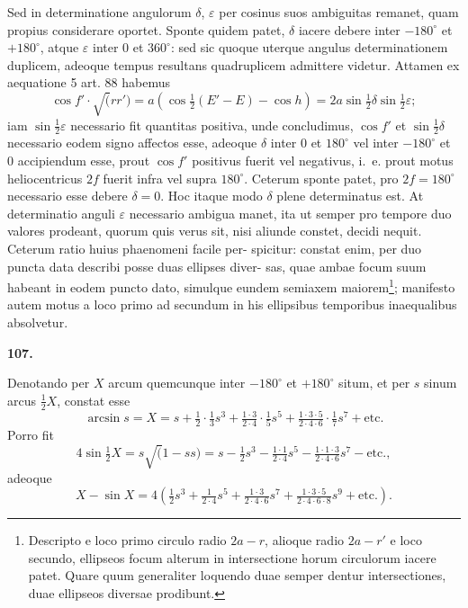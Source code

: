 \documentclass[12pt,a4paper]{article}
\begin{document}
Sed in determinatione angulorum $\delta$, $\varepsilon$ per cosinus suos ambiguitas remanet,
quam propius considerare oportet. Sponte quidem patet, $\delta$ iacere debere inter
$-180^\circ$ et $+180^\circ$, atque $\varepsilon$ inter $0$ et $360^\circ$: sed sic quoque uterque angulus
determinationem duplicem, adeoque tempus resultans quadruplicem admittere
videtur. Attamen ex aequatione 5 art. 88 habemus
\[
\cos f' \cdot \surd(rr') = a(\cos\tfrac{1}{2}(E'-E) - \cos h) = 2a\sin\tfrac{1}{2}\delta\sin\tfrac{1}{2}\varepsilon;
\]
iam $\sin\tfrac{1}{2}\varepsilon$ necessario fit quantitas positiva, unde concludimus, $\cos f'$ et $\sin\tfrac{1}{2}\delta$
necessario eodem signo affectos esse, adeoque $\delta$ inter $0$ et $180^\circ$ vel inter
$-180^\circ$ et $0$ accipiendum esse, prout $\cos f'$ positivus fuerit vel negativus, i.~e.
prout motus heliocentricus $2f$ fuerit infra vel supra $180^\circ$. Ceterum sponte
patet, pro $2f = 180^\circ$ necessario esse debere $\delta = 0$. Hoc itaque modo $\delta$
plene determinatus est. At determinatio anguli $\varepsilon$ necessario ambigua manet,
ita ut semper pro tempore duo valores prodeant, quorum quis verus sit, nisi
aliunde constet, decidi nequit. Ceterum ratio huius phaenomeni facile per-
spicitur: constat enim, per duo puncta data describi posse duas ellipses diver-
sas, quae ambae focum suum habeant in eodem puncto dato, simulque eundem
semiaxem maiorem\footnote{Descripto e loco primo circulo radio $2a - r$, alioque radio $2a - r'$ e loco secundo, ellipseos focum
alterum in intersectione horum circulorum iacere patet. Quare quum generaliter loquendo duae semper dentur
intersectiones, duae ellipseos diversae prodibunt.};
manifesto autem motus a loco primo ad secundum in
his ellipsibus temporibus inaequalibus absolvetur.

\bigskip
\noindent\textbf{107.}

Denotando per $X$ arcum quemcunque inter $-180^\circ$ et $+180^\circ$ situm, et per
$s$ sinum arcus $\frac{1}{2}X$, constat esse
\[
\arcsin s = X = s + \tfrac{1}{2}\cdot\tfrac{1}{3}s^3 + \tfrac{1\cdot 3}{2\cdot 4}\cdot\tfrac{1}{5}s^5 + \tfrac{1\cdot 3\cdot 5}{2\cdot 4\cdot 6}\cdot\tfrac{1}{7}s^7 + \text{etc.}
\]
Porro fit
\[
4\sin\tfrac{1}{2}X = s\surd(1-ss) = s - \tfrac{1}{2}s^3 - \tfrac{1\cdot 1}{2\cdot 4}s^5 - \tfrac{1\cdot 1\cdot 3}{2\cdot 4\cdot 6}s^7 - \text{etc.},
\]
adeoque
\[
X - \sin X = 4(\tfrac{1}{2}s^3 + \tfrac{1}{2\cdot 4}s^5 + \tfrac{1\cdot 3}{2\cdot 4\cdot 6}s^7 + \tfrac{1\cdot 3\cdot 5}{2\cdot 4\cdot 6\cdot 8}s^9 + \text{etc.}).
\]
\end{document}
